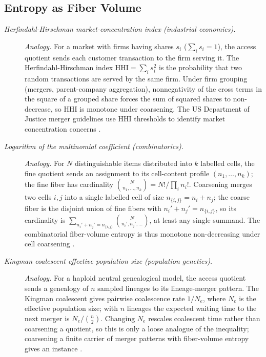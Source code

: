 \subsection*{ Entropy as Fiber Volume}
\begingroup\small
\begin{description}
\item[\emph{Herfindahl-Hirschman market-concentration
index (industrial economics).}] \textit{Analogy.}
For a market with firms having shares \(s_i\)
(\(\sum_i s_i=1\)), the access quotient sends each
customer transaction to the firm serving it.  The
Herfindahl-Hirschman index
\(\mathrm{HHI}=\sum_i s_i^2\) is the probability that
two random transactions are served by the same firm.
Under firm grouping (mergers, parent-company
aggregation), nonnegativity of the cross terms in the square of a grouped share
forces the sum of squared shares to non-decrease, so HHI is monotone under
coarsening.  The US Department of Justice merger
guidelines use HHI thresholds to identify market
concentration concerns \citep{Hirschman1964HHI}.

\item[\emph{Logarithm of the multinomial coefficient
(combinatorics).}] \textit{Analogy.}
For \(N\) distinguishable items distributed into \(k\)
labelled cells, the fine quotient sends an assignment
to its cell-content profile
\((n_1,\dots,n_k)\); the fine fiber has cardinality
\(\binom{N}{n_1,\dots,n_k}=N!/\prod_i n_i!\).
Coarsening merges two cells \(i,j\) into a single
labelled cell of size \(n_{\{i,j\}}=n_i+n_j\); the
coarse fiber is the disjoint union of fine fibers
with \(n_i'+n_j'=n_{\{i,j\}}\), so its cardinality is
\(\sum_{n_i'+n_j'=n_{\{i,j\}}}
\binom{N}{n_i',n_j',\dots}\), at least any single
summand.  The combinatorial fiber-volume entropy is
thus monotone non-decreasing under cell coarsening
\citep{Knuth1997TAOCP}.

\item[\emph{Kingman coalescent effective population
size (population genetics).}] \textit{Analogy.}
For a haploid neutral genealogical model, the access
quotient sends a genealogy of \(n\) sampled lineages
to its lineage-merger pattern.  The Kingman coalescent
gives pairwise coalescence rate \(1/N_e\), where
\(N_e\) is the effective population size; with \(n\) lineages the expected waiting time to the next merger is \(N_e/\binom n2\).  Changing \(N_e\) rescales coalescent time rather than coarsening a quotient, so this is only a loose analogue of the  inequality; coarsening a finite carrier of merger patterns with fiber-volume entropy gives an instance \citep{Kingman1982Coalescent}.
\end{description}
\endgroup


